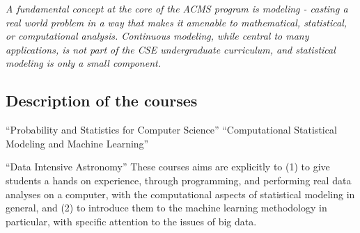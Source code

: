 


{\em A fundamental concept at the core of the ACMS program is modeling - casting a real world problem in a way that makes it amenable to mathematical, statistical, or computational analysis. 
 Continuous modeling, while central to many applications, is not part of the CSE undergraduate curriculum, and statistical modeling is only a small component. }

 

\subsection{Description of the courses}
\label{sec:course-descr}

\bits
\item \statcl ``Probability and Statistics for Computer Science''
``Computational Statistical Modeling and Machine Learning''
\item \astrocl ``Data Intensive Astronomy'' 
\eits
These courses aims are explicitly to (1) to give students a hands on experience, through programming, and performing real data analyses on a computer, with the computational aspects of 
statistical modeling in general, and (2) to introduce them to the  machine learning methodology in particular, with specific attention to the issues of big data.

